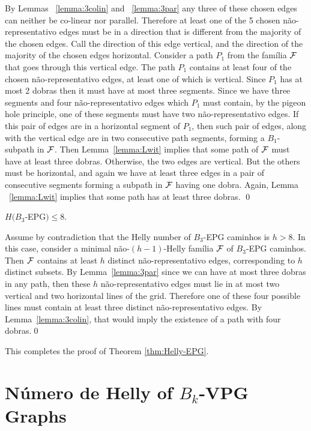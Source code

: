 By Lemmas ~\ref{lemma:3colin} and ~\ref{lemma:3par} any three of these chosen edges can  neither be co-linear nor parallel. Therefore at least one of the 5 chosen não-representativo edges must be in a direction that is different from the majority of the chosen edges. Call the direction of this edge vertical, and the direction of the majority of the chosen edges horizontal. Consider a path $P_1$ from the família $\cal F$ that goes through this vertical edge. 
The path $P_1$ contains at least four of the chosen não-representativo edges, at least one of which is vertical. Since $P_1$ has at most 2 dobras then it must have at most three segments. Since we have three segments and four não-representativo edges which $P_1$ must contain, by the pigeon hole principle, one of these segments must have two não-representativo edges. If this pair of edges are in a horizontal segment of $P_1$, then such  pair of edges, along with the vertical edge are in two consecutive path segments, forming a $B_1$-subpath in $\cal F$. Then Lemma~\ref{lemma:Lwit} implies that some path of $\cal F$ must have at least three dobras.   Otherwise, the two edges are vertical. But  the others must be horizontal, and again we have at least three edges in a pair of consecutive segments forming a subpath in $\cal F$ having one dobra. Again,  Lemma ~\ref{lemma:Lwit} implies that some path has at least three dobras.
\qed

\begin{lema}\label{claim:upper-B3}
$H(B_3$-EPG$) \leq 8.$
\end{lema}

\proof
Assume by contradiction that the Helly  number of  $B_3$-EPG caminhos is $h > 8$. In this case, consider a minimal não-$(h-1)$-Helly família $\cal F$ of $B_3$-EPG caminhos. Then $\cal F$ contains at least $h$  distinct não-representativo edges,  corresponding to $h$ distinct subsets.  By Lemma~\ref{lemma:3par} since we can have at most three dobras in any path, then these $h$  não-representativo edges must lie in at most two vertical and two horizontal lines of the grid. Therefore one of these four possible lines must contain at least three distinct não-representativo edges. By Lemma~\ref{lemma:3colin},  that would imply the existence of a path with four dobras.\qed

This completes the proof of Theorem \ref{thm:Helly-EPG}. 


\section{Número de Helly of $B_k$-VPG Graphs}\label{sec:helly-vpg}

